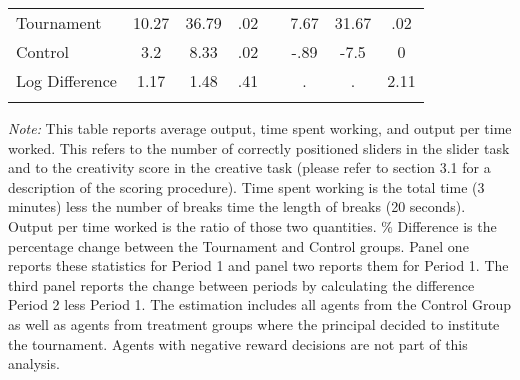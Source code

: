 \begin{landscape}
\begin{table}[h]
\begin{center}
{\begin{tabular}{lccccccc}
\hline
Tournament & 10.27 & 36.79 & .02 && 7.67 & 31.67 & .02 \\
Control & 3.2 & 8.33 & .02 && -.89 & -7.5 & 0 \\
Log Difference & 1.17 & 1.48 & .41 && . & . & 2.11 \\
\hline\hline\noalign{\medskip}
\end{tabular}}
\begin{minipage}{1.2\textwidth}
\footnotesize {\it Note:} This table reports average output, time spent working, and output per time worked. 
This refers to the number of correctly positioned sliders in the slider task and to the creativity score in the creative task (please refer to section 3.1 for a description of the scoring procedure). 
Time spent working is the total time (3 minutes) less the number of breaks time the length of breaks (20 seconds). 
Output per time worked is the ratio of those two quantities. 
\% Difference is the percentage change between the Tournament and Control groups. 
Panel one reports these statistics for Period 1 and panel two reports them for Period 1. 
The third panel reports the change between periods by calculating the difference Period 2 less Period 1. 
The estimation includes all agents from the Control Group as well as agents from treatment groups where the principal decided to institute the tournament. Agents with negative reward decisions are not part of this analysis. \end{minipage}
\end{center}
\end{table}
\end{landscape}